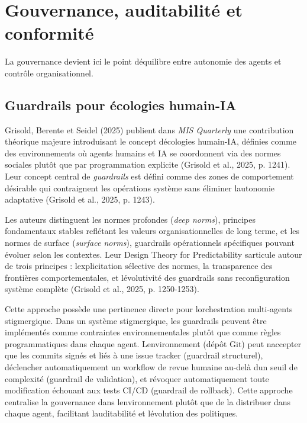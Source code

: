 \documentclass[12pt,a4paper]{article}
\begin{document}
\section{Gouvernance, auditabilité et
conformité}\label{gouvernance-auditabilituxe9-et-conformituxe9}

La gouvernance devient ici le point d\textquotesingle équilibre entre
autonomie des agents et contrôle organisationnel.

\subsection{Guardrails pour écologies
humain-IA}\label{guardrails-pour-uxe9cologies-humain-ia}

Grisold, Berente et Seidel (2025) publient dans \emph{MIS Quarterly} une
contribution théorique majeure introduisant le concept
d\textquotesingle écologies humain-IA, définies comme des environnements
où agents humains et IA se coordonnent via des normes sociales plutôt
que par programmation explicite (Grisold et al., 2025, p. 1241). Leur
concept central de \emph{guardrails} est défini comme des zones de
comportement désirable qui contraignent les opérations système sans
éliminer l\textquotesingle autonomie adaptative (Grisold et al., 2025,
p. 1243).

Les auteurs distinguent les normes profondes (\emph{deep norms}),
principes fondamentaux stables reflétant les valeurs organisationnelles
de long terme, et les normes de surface (\emph{surface norms}),
guardrails opérationnels spécifiques pouvant évoluer selon les
contextes. Leur Design Theory for Predictability
s\textquotesingle articule autour de trois principes :
l\textquotesingle explicitation sélective des normes, la transparence
des frontières comportementales, et l\textquotesingle évolutivité des
guardrails sans reconfiguration système complète (Grisold et al., 2025,
p. 1250-1253).

Cette approche possède une pertinence directe pour
l\textquotesingle orchestration multi-agents stigmergique. Dans un
système stigmergique, les guardrails peuvent être implémentés comme
contraintes environnementales plutôt que comme règles programmatiques
dans chaque agent. L\textquotesingle environnement (dépôt Git) peut
n\textquotesingle accepter que les commits signés et liés à une issue
tracker (guardrail structurel), déclencher automatiquement un workflow
de revue humaine au-delà d\textquotesingle un seuil de complexité
(guardrail de validation), et révoquer automatiquement toute
modification échouant aux tests CI/CD (guardrail de rollback). Cette
approche centralise la gouvernance dans l\textquotesingle environnement
plutôt que de la distribuer dans chaque agent, facilitant
l\textquotesingle auditabilité et l\textquotesingle évolution des
politiques.
\end{document}
